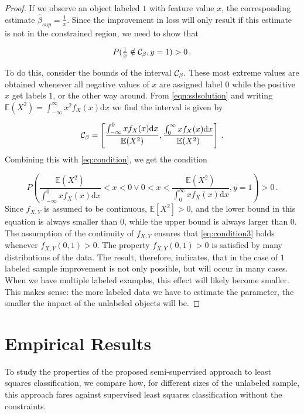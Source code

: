 \documentclass{elsarticle}
\begin{document}
\begin{proof}
If we observe an object labeled $1$ with feature value $x$, the corresponding estimate $\hat{\beta}_{sup}=\tfrac{1}{x}$. Since the improvement in loss will only result if this estimate is not in the constrained region, we need to show that

\begin{equation} \label{eq:condition}
P(\tfrac{1}{x} \notin \mathcal{C}_{\beta},y=1)>0 \, .
\end{equation}

To do this, consider the bounds of the interval $\mathcal{C}_{\beta}$. These most extreme values are obtained whenever all negative values of $x$ are assigned label $0$ while the positive $x$ get labels $1$, or the other way around. From \eqref{eqn:sslsolution} and writing $\mathbb{E}(X^2)=\int_{-\infty}^{\infty} { x^2 f_X(x) \mathrm{d}x}$ we find the interval is given by

\begin{equation} \label{eq:condition2}
\mathcal{C}_{\beta}=\left[ \frac{\int_{-\infty}^{0}{x f_X(x) \mathrm{d}x }}{\mathbb{E}(X^2)},\frac{\int_{0}^{\infty}{x f_X(x)  \mathrm{d}x }}{\mathbb{E}(X^2)} \right] \, .
\end{equation}
Combining this with \eqref{eq:condition}, we get the condition

\begin{equation} \label{eq:condition3}
P \left( \frac{\mathbb{E}(X^2)}{\int_{-\infty}^{0}{x f_X(x)  \mathrm{d}x }} < x < 0 \vee 0 < x < \frac{\mathbb{E}(X^2)}{\int_{0}^{\infty}{x f_X(x)  \mathrm{d}x }},y=1 \right) > 0 \, .
\end{equation}
Since $f_{X,Y}$ is assumed to be continuous, $\mathbb{E}[X^2]>0$, and the lower bound in this equation is always smaller than $0$, while the upper bound is always larger than $0$. The assumption of the continuity of $f_{X,Y}$ ensures that  \eqref{eq:condition3} holds whenever $f_{X,Y}(0,1)>0$.  The property $f_{X,Y}(0,1)>0$ is satisfied by many distributions of the data. The result, therefore, indicates, that in the case of $1$ labeled sample improvement is not only possible, but will occur in many cases. When we have multiple labeled examples, this effect will likely become smaller. This makes sense: the more labeled data we have to estimate the parameter, the smaller the impact of the unlabeled objects will be. \hfill
\end{proof}

\section{Empirical Results} 
\label{section:empiricalresults}
To study the properties of the proposed semi-supervised approach to least squares classification, we compare how, for different sizes of the unlabeled sample, this approach fares against supervised least squares classification without the constraints. 
\end{document}

